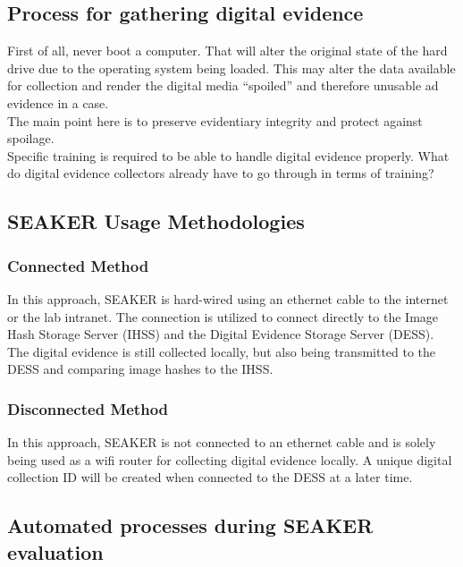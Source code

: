 \documentclass[12pt]{article}
\begin{document}
\subsection{Process for gathering digital evidence}

First of all, never boot a computer.  That will alter the original state of the hard drive due to the operating
system being loaded.  This may alter the data available for collection and render the digital media ``spoiled'' and
therefore unusable ad evidence in a case.\\

The main point here is to preserve evidentiary integrity and protect against spoilage.\\

Specific training is required to be able to handle digital evidence properly.  What do digital evidence collectors
already have to go through in terms of training?\\

\subsection{SEAKER Usage Methodologies}
\subsubsection{Connected Method}

In this approach, SEAKER is hard-wired using an ethernet cable to the internet or the lab intranet.  The connection
is utilized to connect directly to the Image Hash Storage Server (IHSS) and the Digital Evidence Storage Server (DESS).
The digital evidence is still collected locally, but also being transmitted to the DESS and comparing image hashes
to the IHSS.\\

\subsubsection{Disconnected Method}

In this approach, SEAKER is not connected to an ethernet cable and is solely being used as a wifi router for
collecting digital evidence locally.  A unique digital collection ID will be created when connected to the DESS
at a later time.

\subsection{Automated processes during SEAKER evaluation}
\end{document}
